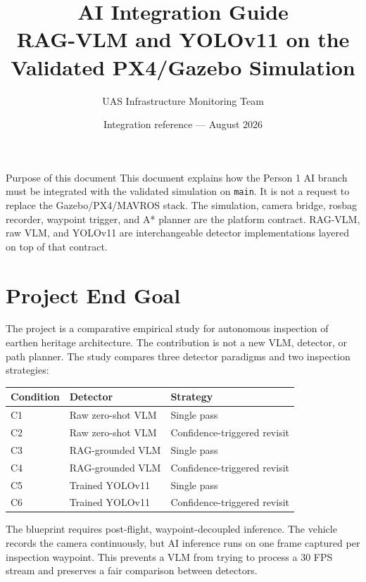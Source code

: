 \documentclass[11pt,a4paper]{article}
\title{\color{primary}\Huge\bfseries
  AI Integration Guide\\[0.25em]
  \Large RAG-VLM and YOLOv11 on the Validated PX4/Gazebo Simulation}
\author{UAS Infrastructure Monitoring Team}
\date{Integration reference --- August 2026}
\newcommand{\code}[1]{\texttt{\small #1}}
\begin{document}
\maketitle
\thispagestyle{empty}

\begin{important}{Purpose of this document}
This document explains how the Person 1 AI branch must be integrated with the
validated simulation on \code{main}. It is not a request to replace the
Gazebo/PX4/MAVROS stack. The simulation, camera bridge, rosbag recorder,
waypoint trigger, and A* planner are the platform contract. RAG-VLM, raw VLM,
and YOLOv11 are interchangeable detector implementations layered on top of
that contract.
\end{important}

\tableofcontents
\newpage

\section{Project End Goal}

The project is a comparative empirical study for autonomous inspection of
earthen heritage architecture. The contribution is not a new VLM, detector,
or path planner. The study compares three detector paradigms and two
inspection strategies:

\begin{center}
\begin{tabular}{lll}
\toprule
Condition & Detector & Strategy \\
\midrule
C1 & Raw zero-shot VLM & Single pass \\
C2 & Raw zero-shot VLM & Confidence-triggered revisit \\
C3 & RAG-grounded VLM & Single pass \\
C4 & RAG-grounded VLM & Confidence-triggered revisit \\
C5 & Trained YOLOv11 & Single pass \\
C6 & Trained YOLOv11 & Confidence-triggered revisit \\
\bottomrule
\end{tabular}
\end{center}

The blueprint requires post-flight, waypoint-decoupled inference. The vehicle
records the camera continuously, but AI inference runs on one frame captured
per inspection waypoint. This prevents a VLM from trying to process a 30 FPS
stream and preserves a fair comparison between detectors.
\end{document}

